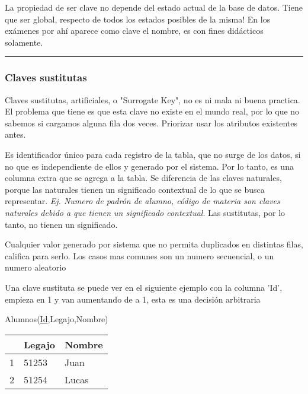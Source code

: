 La propiedad de ser clave no depende del estado actual de la base de datos. Tiene que ser global, respecto de todos los estados posibles de la misma!
En los exámenes por ahí aparece como clave el nombre, es con fines didácticos solamente.

\noindent\rule{\textwidth}{0.5pt}

\subsubsection*{Claves sustitutas}
Claves sustitutas, artificiales, o "Surrogate Key", no es ni mala ni buena practica. El problema que tiene es que esta clave no existe en el mundo real, por lo que no sabemos si cargamos alguna fila dos veces. Priorizar usar los atributos existentes antes.

Es identificador único para cada registro de la tabla, que no surge de los datos, si no que es independiente de ellos y generado por el sistema. Por lo tanto, es una columna extra que se agrega a la tabla. Se diferencia de las claves naturales, porque las naturales tienen un significado contextual de lo que se busca representar. \textit{Ej. Numero de padrón de alumno, código de materia son claves naturales debido a que tienen un significado contextual}. Las sustitutas, por lo tanto, no tienen un significado.

Cualquier valor generado por sistema que no permita duplicados en distintas filas, califica para serlo. Los casos mas comunes son un numero secuencial, o un numero aleatorio

Una clave sustituta se puede ver en el siguiente ejemplo con la columna 'Id', empieza en 1 y van aumentando de a 1, esta es una decisión arbitraria

Alumnos(\underline{Id},Legajo,Nombre)
\begin{table}[!htb]
\centering
\begin{tabular}{|l|l|l|}
\hline
\rowcolor[HTML]{FFFFC7} 
\multicolumn{1}{|c|}{\cellcolor[HTML]{FFFFC7}Id} & \multicolumn{1}{c|}{\cellcolor[HTML]{FFFFC7}Legajo} & Nombre \\ \hline
1                                                & 51253                                               & Juan   \\ \hline
2                                                & 51254                                               & Lucas  \\ \hline
\end{tabular}
\end{table}

